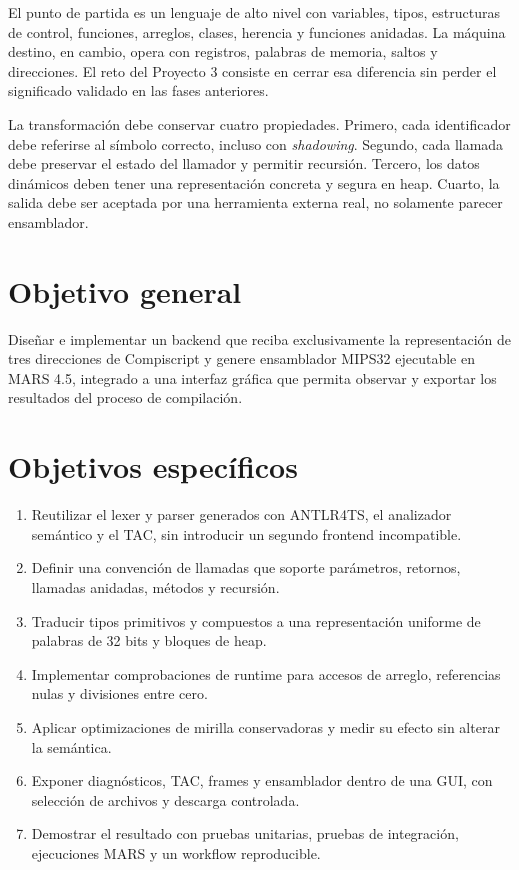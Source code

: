 \documentclass[11pt,letterpaper,oneside]{report}
\begin{document}
El punto de partida es un lenguaje de alto nivel con variables, tipos, estructuras de control, funciones, arreglos, clases, herencia y funciones anidadas. La m\'aquina destino, en cambio, opera con registros, palabras de memoria, saltos y direcciones. El reto del Proyecto 3 consiste en cerrar esa diferencia sin perder el significado validado en las fases anteriores.

La transformaci\'on debe conservar cuatro propiedades. Primero, cada identificador debe referirse al s\'imbolo correcto, incluso con \emph{shadowing}. Segundo, cada llamada debe preservar el estado del llamador y permitir recursi\'on. Tercero, los datos din\'amicos deben tener una representaci\'on concreta y segura en heap. Cuarto, la salida debe ser aceptada por una herramienta externa real, no solamente parecer ensamblador.

\section{Objetivo general}

Dise\~nar e implementar un backend que reciba exclusivamente la representaci\'on de tres direcciones de Compiscript y genere ensamblador MIPS32 ejecutable en MARS 4.5, integrado a una interfaz gr\'afica que permita observar y exportar los resultados del proceso de compilaci\'on.

\section{Objetivos espec\'ificos}

\begin{enumerate}
  \item Reutilizar el lexer y parser generados con ANTLR4TS, el analizador sem\'antico y el TAC, sin introducir un segundo frontend incompatible.
  \item Definir una convenci\'on de llamadas que soporte par\'ametros, retornos, llamadas anidadas, m\'etodos y recursi\'on.
  \item Traducir tipos primitivos y compuestos a una representaci\'on uniforme de palabras de 32 bits y bloques de heap.
  \item Implementar comprobaciones de runtime para accesos de arreglo, referencias nulas y divisiones entre cero.
  \item Aplicar optimizaciones de mirilla conservadoras y medir su efecto sin alterar la sem\'antica.
  \item Exponer diagn\'osticos, TAC, frames y ensamblador dentro de una GUI, con selecci\'on de archivos y descarga controlada.
  \item Demostrar el resultado con pruebas unitarias, pruebas de integraci\'on, ejecuciones MARS y un workflow reproducible.
\end{enumerate}
\end{document}

